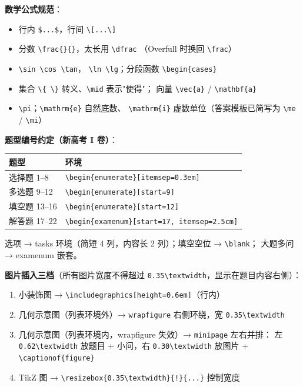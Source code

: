 \documentclass[11pt,a4paper]{ctexart}
\begin{document}
\textbf{数学公式规范}：

\begin{itemize}
  \item 行内 \texttt{\$...\$}，行间 \texttt{\textbackslash[...\textbackslash]}
  \item 分数 \texttt{\textbackslash frac\{\}\{\}}，太长用 \texttt{\textbackslash dfrac}
        （Overfull 时换回 \texttt{\textbackslash frac}）
  \item \texttt{\textbackslash sin \textbackslash cos \textbackslash tan}，
        \texttt{\textbackslash ln \textbackslash lg}；分段函数 \texttt{\textbackslash begin\{cases\}}
  \item 集合 \texttt{\textbackslash\{ \textbackslash\}} 转义、\texttt{\textbackslash mid} 表示"使得"；
        向量 \texttt{\textbackslash vec\{a\}} / \texttt{\textbackslash mathbf\{a\}}
  \item \texttt{\textbackslash pi}；\texttt{\textbackslash mathrm\{e\}} 自然底数、
        \texttt{\textbackslash mathrm\{i\}} 虚数单位（答案模板已简写为
        \texttt{\textbackslash me} / \texttt{\textbackslash mi}）
\end{itemize}

\textbf{题型编号约定（新高考 I 卷）}：

\begin{center}
\begin{tabular}{ll}
\toprule
题型 & 环境 \\
\midrule
选择题 1--8  & \texttt{\textbackslash begin\{enumerate\}[itemsep=0.3em]} \\
多选题 9--12 & \texttt{\textbackslash begin\{enumerate\}[start=9]} \\
填空题 13--16 & \texttt{\textbackslash begin\{enumerate\}[start=12]} \\
解答题 17--22 & \texttt{\textbackslash begin\{examenum\}[start=17, itemsep=2.5cm]} \\
\bottomrule
\end{tabular}
\end{center}

选项 → tasks 环境（简短 4 列，内容长 2 列）；填空空位 → \texttt{\textbackslash blank}；
大题多问 → examenum 嵌套。

\textbf{图片插入三档}（所有图片宽度不得超过 \texttt{0.35\textbackslash textwidth}，显示在题目内容右侧）：

\begin{enumerate}
  \item 小装饰图 → \texttt{\textbackslash includegraphics[height=0.6em]}（行内）
  \item 几何示意图（列表环境外）→ \texttt{wrapfigure} 右侧环绕，宽 \texttt{0.35\textbackslash textwidth}
  \item 几何示意图（列表环境内，wrapfigure 失效）→ \texttt{minipage} 左右并排：
        左 \texttt{0.62\textbackslash textwidth} 放题目 + 小问，右 \texttt{0.30\textbackslash textwidth}
        放图片 + \texttt{\textbackslash captionof\{figure\}}
  \item TikZ 图 → \texttt{\textbackslash resizebox\{0.35\textbackslash textwidth\}\{!\}\{...\}} 控制宽度
\end{enumerate}
\end{document}
